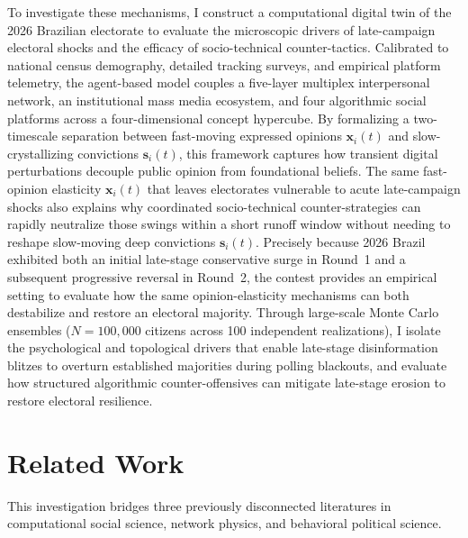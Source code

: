 \documentclass[a4paper,fleqn]{cas-dc}
\begin{document}
To investigate these mechanisms, I construct a computational digital twin of the 2026 Brazilian electorate to evaluate the microscopic drivers of late-campaign electoral shocks and the efficacy of socio-technical counter-tactics. Calibrated to national census demography, detailed tracking surveys, and empirical platform telemetry, the agent-based model couples a five-layer multiplex interpersonal network, an institutional mass media ecosystem, and four algorithmic social platforms across a four-dimensional concept hypercube. By formalizing a two-timescale separation between fast-moving expressed opinions $\mathbf{x}_i(t)$ and slow-crystallizing convictions $\mathbf{s}_i(t)$, this framework captures how transient digital perturbations decouple public opinion from foundational beliefs. The same fast-opinion elasticity $\mathbf{x}_i(t)$ that leaves electorates vulnerable to acute late-campaign shocks also explains why coordinated socio-technical counter-strategies can rapidly neutralize those swings within a short runoff window without needing to reshape slow-moving deep convictions $\mathbf{s}_i(t)$. Precisely because 2026 Brazil exhibited both an initial late-stage conservative surge in Round~1 and a subsequent progressive reversal in Round~2, the contest provides an empirical setting to evaluate how the same opinion-elasticity mechanisms can both destabilize and restore an electoral majority. Through large-scale Monte Carlo ensembles ($N = 100{,}000$ citizens across 100 independent realizations), I isolate the psychological and topological drivers that enable late-stage disinformation blitzes to overturn established majorities during polling blackouts, and evaluate how structured algorithmic counter-offensives can mitigate late-stage erosion to restore electoral resilience.

\section{Related Work}
\label{sec:related_work}

This investigation bridges three previously disconnected literatures in computational social science, network physics, and behavioral political science.
\end{document}
